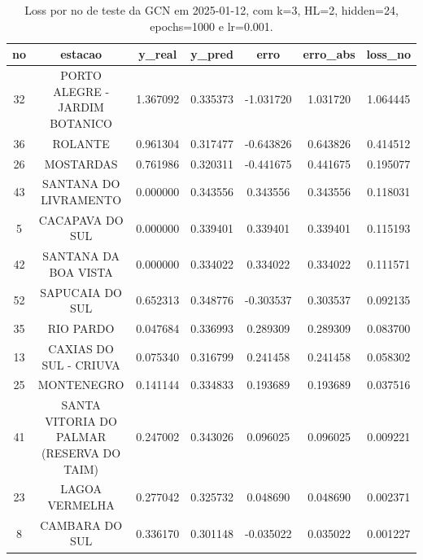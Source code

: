 \begin{table}[h]
\centering
\caption{Loss por no de teste da GCN em 2025-01-12, com k=3, HL=2, hidden=24, epochs=1000 e lr=0.001.}
\label{tab:gcn_loss_k3_hl2_h24_e1000_d20250112}
\begin{tabular}{ccccccc}
\toprule
no & estacao & y\_real & y\_pred & erro & erro\_abs & loss\_no \\
\midrule
32 & PORTO ALEGRE - JARDIM BOTANICO & 1.367092 & 0.335373 & -1.031720 & 1.031720 & 1.064445 \\
36 & ROLANTE & 0.961304 & 0.317477 & -0.643826 & 0.643826 & 0.414512 \\
26 & MOSTARDAS & 0.761986 & 0.320311 & -0.441675 & 0.441675 & 0.195077 \\
43 & SANTANA DO LIVRAMENTO & 0.000000 & 0.343556 & 0.343556 & 0.343556 & 0.118031 \\
5 & CACAPAVA DO SUL & 0.000000 & 0.339401 & 0.339401 & 0.339401 & 0.115193 \\
42 & SANTANA DA BOA VISTA & 0.000000 & 0.334022 & 0.334022 & 0.334022 & 0.111571 \\
52 & SAPUCAIA DO SUL & 0.652313 & 0.348776 & -0.303537 & 0.303537 & 0.092135 \\
35 & RIO PARDO & 0.047684 & 0.336993 & 0.289309 & 0.289309 & 0.083700 \\
13 & CAXIAS DO SUL - CRIUVA & 0.075340 & 0.316799 & 0.241458 & 0.241458 & 0.058302 \\
25 & MONTENEGRO & 0.141144 & 0.334833 & 0.193689 & 0.193689 & 0.037516 \\
41 & SANTA VITORIA DO PALMAR (RESERVA DO TAIM) & 0.247002 & 0.343026 & 0.096025 & 0.096025 & 0.009221 \\
23 & LAGOA VERMELHA & 0.277042 & 0.325732 & 0.048690 & 0.048690 & 0.002371 \\
8 & CAMBARA DO SUL & 0.336170 & 0.301148 & -0.035022 & 0.035022 & 0.001227 \\
\bottomrule
\end{tabular}
\end{table}
